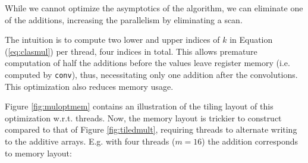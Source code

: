 While we cannot optimize the asymptotics of the algorithm, we can eliminate one
of the additions, increasing the parallelism by eliminating a scan.

The intuition is to compute two lower and upper indices of $k$ in Equation
(\ref{eq:clasmul}) per thread, four indices in total. This allows premature
computation of half the additions before the values leave register memory
(i.e. computed by \texttt{conv}), thus, necessitating only one addition after
the convolutions. This optimization also reduces memory usage.

Figure \ref{fig:muloptmem} contains an illustration of the tiling layout of this
optimization w.r.t. threads. Now, the memory layout is trickier to construct
compared to that of Figure \ref{fig:tiledmult}, requiring threads to alternate
writing to the additive arrays. E.g. with four threads ($m = 16$) the addition
corresponds to memory layout:\\

